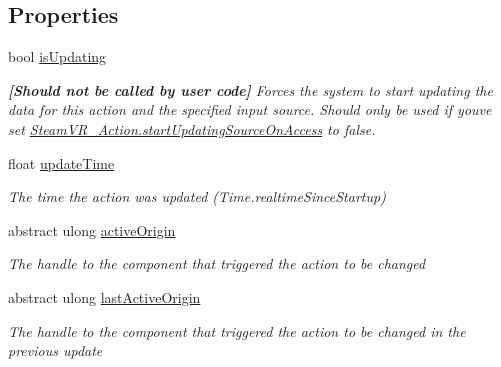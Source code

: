 \subsection*{Properties}
\begin{DoxyCompactItemize}
\item 
bool \mbox{\hyperlink{class_valve_1_1_v_r_1_1_steam_v_r___action___in___source_a385091591417e7c45289f89365c7a43e}{is\+Updating}}
\begin{DoxyCompactList}\small\item\em {\bfseries{\mbox{[}Should not be called by user code\mbox{]}}} Forces the system to start updating the data for this action and the specified input source. Should only be used if you\textquotesingle{}ve set \mbox{\hyperlink{class_valve_1_1_v_r_1_1_steam_v_r___action_ae27e9858dec18a4307cca7779ed87ad8}{Steam\+V\+R\+\_\+\+Action.\+start\+Updating\+Source\+On\+Access}} to false. \end{DoxyCompactList}\item 
float \mbox{\hyperlink{class_valve_1_1_v_r_1_1_steam_v_r___action___in___source_a2d300fd44241f60b98cd73088d120c24}{update\+Time}}
\begin{DoxyCompactList}\small\item\em The time the action was updated (Time.\+realtime\+Since\+Startup) \end{DoxyCompactList}\item 
abstract ulong \mbox{\hyperlink{class_valve_1_1_v_r_1_1_steam_v_r___action___in___source_a1e92c5acceb5d145b96b263d679fb5ee}{active\+Origin}}
\begin{DoxyCompactList}\small\item\em The handle to the component that triggered the action to be changed \end{DoxyCompactList}\item 
abstract ulong \mbox{\hyperlink{class_valve_1_1_v_r_1_1_steam_v_r___action___in___source_adb2c1b7b1f6678ffcc8a72b544bcc9d1}{last\+Active\+Origin}}
\begin{DoxyCompactList}\small\item\em The handle to the component that triggered the action to be changed in the previous update \end{DoxyCompactList}\item 

\end{DoxyCompactItemize}
